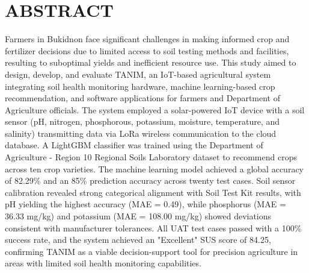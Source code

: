 \chapter*{ABSTRACT}
{\setlength{\baselineskip}{22pt}

Farmers in Bukidnon face significant challenges in making informed crop and fertilizer decisions due to limited access to soil testing methods and facilities, resulting to suboptimal yields and inefficient resource use. This study aimed to design, develop, and evaluate TANIM, an IoT-based agricultural system integrating soil health monitoring hardware, machine learning-based crop recommendation, and software applications for farmers and Department of Agriculture officials.
The system employed a solar-powered IoT device with a soil sensor (pH, nitrogen, phosphorous, potassium, moisture, temperature, and salinity) transmitting data via LoRa wireless communication to the cloud database. A LightGBM classifier was trained using the Department of Agriculture - Region 10 Regional Soils Laboratory dataset to recommend crops across ten crop varieties. The machine learning model achieved a global accuracy of 82.29\% and an 85\% prediction accuracy across twenty test cases. Soil sensor calibration revealed strong categorical alignment with Soil Test Kit results, with pH yielding the highest accuracy (MAE = 0.49), while phosphorus (MAE = 36.33 mg/kg) and potassium (MAE = 108.00 mg/kg) showed deviations consistent with manufacturer tolerances. All UAT test cases passed with a 100\% success rate, and the system achieved an "Excellent" SUS score of 84.25, confirming TANIM as a viable decision-support tool for precision agriculture in areas with limited soil health monitoring capabilities.\\ 

}
